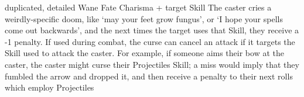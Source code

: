   {duplicated, detailed}%
  {Wane}%
  {Fate}%
  {Charisma + target Skill}%
  {The caster cries a weirdly-specific doom, like `may your feet grow fungus', or `I hope your spells come out backwards', and the next  times the target uses that Skill, they receive a -1 penalty.}%
  {If used during combat, the curse can cancel an attack if it targets the Skill used to attack the caster.
  For example, if someone aims their bow at the caster, the caster might curse their Projectiles Skill; a miss would imply that they fumbled the arrow and dropped it, and then receive a penalty to their next  rolls which employ Projectiles}
